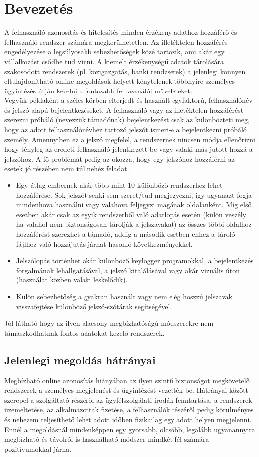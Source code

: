 \section{Bevezetés}
A felhasználó azonosítás és hitelesítés minden érzékeny adathoz hozzáférő és felhasználó rendszer számára megkerülhetetlen. Az illetéktelen hozzáférés engedélyezése a legsúlyosabb sebezhetőségek közé tartozik, ami akár egy vállalkozást csődbe tud vinni.
A kiemelt érzékenységű adatok tárolására szakosodott rendszerek (pl. közigazgatás, banki rendzserek) a jelenlegi könnyen eltulajdonítható online megoldások helyett kénytelenek többnyire személyes ügyintézés útján kezelni a fontosabb felhasználói műveleteket.
\\
Vegyük példaként a széles körben elterjedt és használt egyfaktorú,  felhasználónév és jelszó alapú bejelentkezéseket. A felhasználó vagy az illetéktelen hozzáférést szerezni próbáló (nevezzük támadónak) bejelentkezést csak az különbözteti meg, hogy az adott felhasználónévhez tartozó jelszót ismeri-e a bejelentkezni próbáló személy. Amennyiben ez a jelszó megfelel, a rendszernek 
nincsen módja ellenőrizni hogy tényleg az eredeti felhasználó jelentkezett be vagy valaki más jutott hozzá a jelszóhoz. A fő problémát pedig az okozza, hogy egy jelszóhoz hozzáférni az esetek jó részében nem túl nehéz feladat.
\begin{itemize}
\item Egy átlag embernek akár több mint 10 különböző rendszerhez lehet hozzáférése. Sok jelszót senki sem szeret/tud megjegyezni, így ugyanazt fogja mindenhova használni vagy valahova feljegyzi magának oldalanként. Míg első esetben akár csak az egyik rendszerből való adatlopás esetén (külön veszély ha valahol nem biztonságosan tárolják a jelszavakat) az összes többi oldalhoz hozzáférést
 szerezhet a támadó, addig a második esetben ehhez a tároló fájlhoz való hozzájutás járhat hasonló következményekkel.
\item Jelszólopás történhet akár különböző keylogger programokkal, a bejelentkezés forgalmának lehallgatásával, a jelszó kitalálásával vagy akár vizuális úton (használat közben valaki leskelődik).
\item Külön sebezhetőség a gyakran használt vagy nem elég hoszzú jelszavak visszafejtése különböző jelszó-szótárak segítségével.
\end{itemize}
Jól látható hogy az ilyen alacsony megbízhatóságú módszerekre nem támaszkodhatnak fontos adatokat kezelő rendszerek.
\subsection{Jelenlegi megoldás hátrányai}
Megbízható online azonosítás hiányában az ilyen szintű biztonságot megkövetelő rendszerek a személyes megjelenést és ügyintézést vezették be. Hátrányai között szerepel a szolgáltató részéről az ügyfélszolgálati irodák fenntartása, a rendszerek üzemeltetése, az alkalmazottak fizetése, a felhasználók részéről pedig körülményes és nehezem teljesíthető lehet adott időben fizikailag egy adott helyen megjelenni. Ennél a megoldásnál mindenképpen egy gyorsabb, olcsóbb, legalább ugyanannyira megbízható és távolról is használható módszer mindkét fél számára pozitívumokkal járna.
